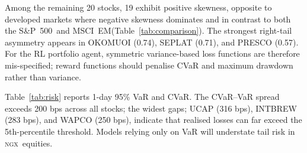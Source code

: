 \documentclass[twoside,11pt]{article}
\newcommand{\ngx}{\textsc{ngx}}
\newcommand{\spidx}{S\&P~500}
\newcommand{\msciem}{MSCI~EM}
\begin{document}
	Among the remaining 20 stocks, 19 exhibit positive skewness, opposite to developed markets where negative skewness dominates and in contrast to both the \spidx\ and \msciem (Table~\ref{tab:comparison}). The strongest right-tail asymmetry appears in OKOMUOI (0.74), SEPLAT (0.71), and PRESCO (0.57). For the RL portfolio agent, symmetric variance-based loss functions are therefore mis-specified; reward functions should penalise CVaR and maximum drawdown rather than variance.
	
	Table~\ref{tab:risk} reports 1-day 95\% VaR and CVaR. The CVaR--VaR spread exceeds 200 bps across all stocks; the widest gaps; UCAP (316 bps), INTBREW (283 bps), and WAPCO (250 bps), indicate that realised losses can far exceed the 5th-percentile threshold. Models relying only on VaR will understate tail risk in \ngx\ equities.
	
\end{document}
